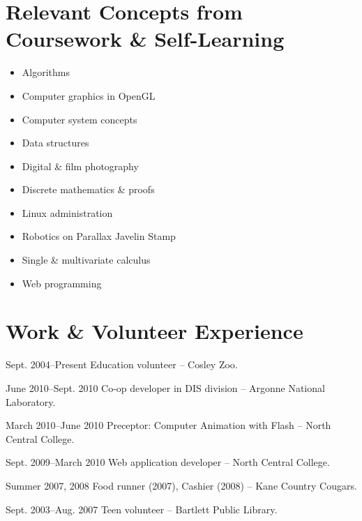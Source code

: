 \documentclass[11pt]{simplecv}
\begin{document}
  \section{Relevant Concepts from Coursework \& Self-Learning}
  \begin{multicols}{2}
    \begin{itemize}
      \item Algorithms
      \item Computer graphics in OpenGL
      \item Computer system concepts
      \item Data structures
      \item Digital \& film photography
      \item Discrete mathematics \& proofs
      \item Linux administration
      \item Robotics on Parallax Javelin Stamp
      \item Single \& multivariate calculus
      \item Web programming
    \end{itemize}
  \end{multicols}

  \section{Work \& Volunteer Experience}
  \begin{topic}
    \item[Sept. 2004--Present] Education volunteer -- Cosley Zoo.
    \item[June 2010--Sept. 2010] Co-op developer in DIS division -- Argonne National Laboratory.
    \item[March 2010--June 2010] Preceptor: Computer Animation with Flash -- North Central College.
    \item[Sept. 2009--March 2010] Web application developer -- North Central College.
    \item[Summer 2007, 2008] Food runner (2007), Cashier (2008) -- Kane Country Cougars.
    \item[Sept. 2003--Aug. 2007] Teen volunteer -- Bartlett Public Library.
  \end{topic}
\end{document}
